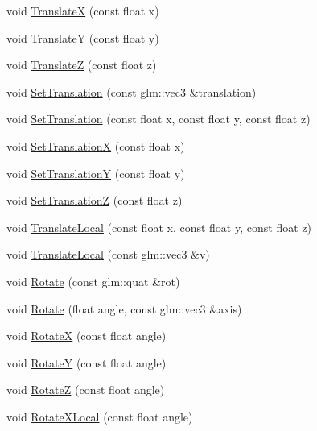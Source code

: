 \begin{DoxyCompactItemize}
void \mbox{\hyperlink{classec_1_1_transform3_d_a0c1e55c9edcd7cb53199fd05ba111099}{TranslateX}} (const float x)
\item 
void \mbox{\hyperlink{classec_1_1_transform3_d_ae95b02e45148ca35e98ae54d23b01904}{TranslateY}} (const float y)
\item 
void \mbox{\hyperlink{classec_1_1_transform3_d_a33c653dddfd16ec7481f1b1313a4505e}{TranslateZ}} (const float z)
\item 
void \mbox{\hyperlink{classec_1_1_transform3_d_a3a2ebde1bdb7b79e080deaee7555e251}{Set\+Translation}} (const glm\+::vec3 \&translation)
\item 
void \mbox{\hyperlink{classec_1_1_transform3_d_a14c627a2eea894334e652ba9046bdcae}{Set\+Translation}} (const float x, const float y, const float z)
\item 
void \mbox{\hyperlink{classec_1_1_transform3_d_a150e25babd8e2aeeb650c768e4d5d448}{Set\+TranslationX}} (const float x)
\item 
void \mbox{\hyperlink{classec_1_1_transform3_d_a93cbe1baa33972865b10554fbacfddec}{Set\+TranslationY}} (const float y)
\item 
void \mbox{\hyperlink{classec_1_1_transform3_d_af7a125c99afbd7e53cf7b905c2ab1db4}{Set\+TranslationZ}} (const float z)
\item 
void \mbox{\hyperlink{classec_1_1_transform3_d_a84df51411133b3402b75fa05bd51faae}{Translate\+Local}} (const float x, const float y, const float z)
\item 
void \mbox{\hyperlink{classec_1_1_transform3_d_a44ece37c7f56329840c2f92ae695e9a2}{Translate\+Local}} (const glm\+::vec3 \&v)
\item 
void \mbox{\hyperlink{classec_1_1_transform3_d_ae2675da2f17fe145cc199412d85777d5}{Rotate}} (const glm\+::quat \&rot)
\item 
void \mbox{\hyperlink{classec_1_1_transform3_d_acaaea3ccdff9e23f1edf6f9fed054afe}{Rotate}} (float angle, const glm\+::vec3 \&axis)
\item 
void \mbox{\hyperlink{classec_1_1_transform3_d_a04e4eaf695ba795bac09e8fa43c0a462}{RotateX}} (const float angle)
\item 
void \mbox{\hyperlink{classec_1_1_transform3_d_a71e31dbecd1bfad8754c7b3bca691876}{RotateY}} (const float angle)
\item 
void \mbox{\hyperlink{classec_1_1_transform3_d_aff76dc65f161ff8401976561772dd2fc}{RotateZ}} (const float angle)
\item 
void \mbox{\hyperlink{classec_1_1_transform3_d_af5995f2c01e062a715f8a3181dd11f04}{Rotate\+X\+Local}} (const float angle)

\end{DoxyCompactItemize}
